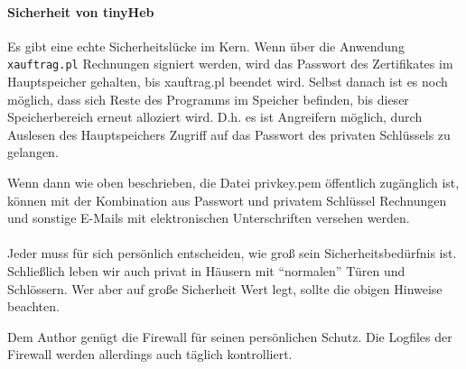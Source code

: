 \paragraph{Sicherheit von tinyHeb}

Es gibt eine echte Sicherheitslücke im \tinyHeb\/ Kern. Wenn über die
Anwendung \verb|xauftrag.pl| Rechnungen signiert werden, wird das
Passwort des Zertifikates im Hauptspeicher gehalten, bis xauftrag.pl
beendet wird. Selbst danach ist es noch möglich, dass sich Reste des
Programms im Speicher befinden, bis dieser Speicherbereich erneut
alloziert wird. D.h. es ist Angreifern möglich, durch Auslesen des 
Hauptspeichers Zugriff auf das Passwort des privaten Schlüssels zu gelangen.

Wenn dann wie oben beschrieben, die Datei privkey.pem öffentlich 
zugänglich ist, können mit der Kombination aus Passwort und privatem
Schlüssel Rechnungen und sonstige E-Mails mit elektronischen Unterschriften
versehen werden.

\paragraph{}
Jeder muss für sich persönlich entscheiden, wie groß sein Sicherheitsbedürfnis
ist. Schließlich leben wir auch privat in Häusern mit ``normalen''
Türen und Schlössern. Wer aber auf große Sicherheit Wert legt, sollte
die obigen Hinweise beachten. 

Dem Author genügt die Firewall für seinen persönlichen Schutz. Die 
Logfiles der Firewall werden allerdings auch täglich kontrolliert.